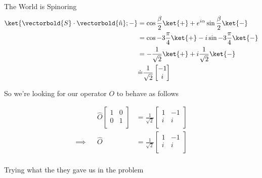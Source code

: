 \begin{answer}
\begin{answerpart}{The World is Spinoring}
    \begin{equation}
      \begin{split}
        \ket{\vectorbold{S}\cdot\vectorbold{\hat{n}}; -}
        &= \cos{\frac{\beta}{2}} \ket{+} + e^{i\alpha}\sin{\frac{\beta}{2}} \ket{-}
        \\
        &= \cos{-3\frac{\pi}{4}} \ket{+} - i\sin{-3\frac{\pi}{4}} \ket{-}
        \\
        &= -\frac{1}{\sqrt{2}}\ket{+} + i\frac{1}{\sqrt{2}}\ket{-}
        \\
        &\dot{=} \frac{1}{\sqrt{2}}
        \begin{bmatrix}
          -1\\i\\
        \end{bmatrix}
        \\
      \end{split}
    \end{equation}

    So we're looking for our operator $O$ to behave as follows

    \begin{equation}
      \begin{alignedat}{2}
        &&\hat{O}
        \begin{bmatrix}
          1 & 0\\ 0 & 1\\
        \end{bmatrix}
        &=
        \frac{1}{\sqrt{2}}
        \begin{bmatrix}
          1 & -1\\ i & i\\
        \end{bmatrix}
        \\
        \implies&& \hat{O}
        &=
        \frac{1}{\sqrt{2}}
        \begin{bmatrix}
          1 & -1\\ i & i\\
        \end{bmatrix}
        \\
      \end{alignedat}
    \end{equation}

    Trying what the they gave us in the problem


\end{answerpart}
\end{answer}
